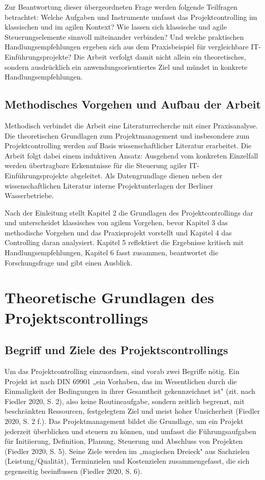 \documentclass[
    12pt, 
    a4paper,
    ]{scrartcl} %
\begin{document}
Zur Beantwortung dieser übergeordneten Frage werden folgende Teilfragen betrachtet: Welche Aufgaben und Instrumente umfasst das Projektcontrolling im klassischen und im agilen Kontext? Wie lassen sich klassische und agile Steuerungselemente sinnvoll miteinander verbinden? Und welche praktischen Handlungsempfehlungen ergeben sich aus dem Praxisbeispiel für vergleichbare IT-Einführungsprojekte? Die Arbeit verfolgt damit nicht allein ein theoretisches, sondern ausdrücklich ein anwendungsorientiertes Ziel und mündet in konkrete Handlungsempfehlungen.

\subsection{Methodisches Vorgehen und Aufbau der Arbeit}
Methodisch verbindet die Arbeit eine Literaturrecherche mit einer Praxisanalyse. Die theoretischen Grundlagen zum Projektmanagement und insbesondere zum Projektcontrolling werden auf Basis wissenschaftlicher Literatur erarbeitet. Die Arbeit folgt dabei einem induktiven Ansatz: Ausgehend vom konkreten Einzelfall werden übertragbare Erkenntnisse für die Steuerung agiler IT-Einführungsprojekte abgeleitet. Als Datengrundlage dienen neben der wissenschaftlichen Literatur interne Projektunterlagen der Berliner Wasserbetriebe.

Nach der Einleitung stellt Kapitel 2 die Grundlagen des Projektcontrollings dar und unterscheidet klassisches von agilem Vorgehen, bevor Kapitel 3 das methodische Vorgehen und das Praxisprojekt vorstellt und Kapitel 4 das Controlling daran analysiert. Kapitel 5 reflektiert die Ergebnisse kritisch mit Handlungsempfehlungen, Kapitel 6 fasst zusammen, beantwortet die Forschungsfrage und gibt einen Ausblick. 

\section{Theoretische Grundlagen des Projektscontrollings}

\subsection{Begriff und Ziele des Projektscontrollings}
Um das Projektcontrolling einzuordnen, sind vorab zwei Begriffe nötig. Ein Projekt ist nach DIN 69901 „ein Vorhaben, das im Wesentlichen durch die Einmaligkeit der Bedingungen in ihrer Gesamtheit gekennzeichnet ist" (zit. nach Fiedler 2020, S. 2), also keine Routineaufgabe, sondern zeitlich begrenzt, mit beschränkten Ressourcen, festgelegtem Ziel und meist hoher Unsicherheit (Fiedler 2020, S. 2 f.). Das Projektmanagement bildet die Grundlage, um ein Projekt jederzeit überblicken und steuern zu können, und umfasst die Führungsaufgaben für Initiierung, Definition, Planung, Steuerung und Abschluss von Projekten (Fiedler 2020, S. 5). Seine Ziele werden im „magischen Dreieck" aus Sachzielen (Leistung/Qualität), Terminzielen und Kostenzielen zusammengefasst, die sich gegenseitig beeinflussen (Fiedler 2020, S. 6).
\end{document}
